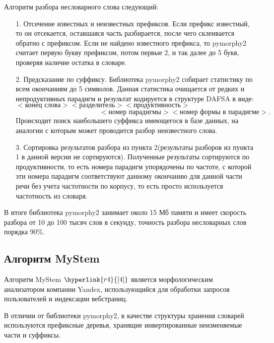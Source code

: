 \documentclass[12pt, a4paper]{article}
\begin{document}
Алгоритм разбора несловарного слова следующий:

\begin{enumerate}
\item[1.] Отсечение известных и неизвестных префиксов. Если префикс известный, то он отсекается, оставшаяся часть разбирается, после чего склеивается обратно с префиксом. Если не найдено известного префикса, то pymorphy2 считает первую букву префиксом, потом первые 2, и так далее до 5 букв, проверяя наличие остатка в словаре.

\item[2.] Предсказание по суффиксу. Библиотека pymorphy2 собирает статистику по всем окончаниям до 5 символов. Данная статистика очищается от редких и непродуктивных парадигм и результат кодируется в структуре DAFSA в виде:
$$<\text{конец слова}> <\text{разделитель}><\text{продуктивность}> \quad \quad \quad \quad \quad \quad \quad \quad \quad \quad \quad \quad$$$$\quad \quad \quad \quad \quad \quad \quad \quad \quad \quad \quad \quad <\text{номер парадигмы}> <\text{номер формы в парадигме}>.$$
Происходит поиск наибольшего суффикса имеющегося в базе данных, на аналогии с которым может проводится разбор неизвестного слова. 

\item[3.] Сортировка результатов разбора из пункта 2(результаты разборов из пункта 1 в данной версии не сортируются). Полученные результаты сортируются по продуктивности, то есть номера парадигм упорядочены по частоте, с которой эти номера парадигм соответствуют данному окончанию для данной части речи без учета частотности по корпусу, то есть просто используется частотность из словаря.
\end{enumerate}

В итоге библиотека pymorphy2 занимает около 15 Мб памяти и имеет скорость разбора от 10 до 100 тысяч слов в секунду, точность разбора несловарных слов порядка 90\%.

\subsection{Алгоритм MyStem}
\quad Алгоритм MyStem $\hyperlink{r4}{[4]}$ является морфологическим анализатором компании Yandex, использующийся для обработки запросов пользователей и индексации вебстраниц.

В отличии от библиотеки pymorphy2, в качестве структуры хранения словарей используются префиксные деревья, хранящие инвертированные неизменяемые части и суффиксы.
\end{document}
